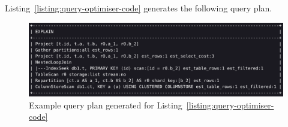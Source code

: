 
Listing~\ref{listing:query-optimiser-code} generates the following query plan.

\begin{figure}[h]
  \centering
  \includegraphics[width=\linewidth]{figures/explain-example.png}
  \caption{Example query plan generated for Listing~\ref{listing:query-optimiser-code}}
  \label{fig:explain-example}
\end{figure}

